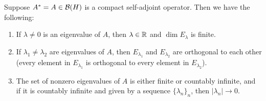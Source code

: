 \begin{theorem}\label{selfadjointeigenspace}
Suppose $A^\ast = A \in \mathcal{B}(H)$ is a compact self-adjoint operator. Then we have the following:
\begin{enumerate}
\item If $\lambda \ne 0$ is an eigenvalue of $A$, then $\lambda \in \mathbb R$ and $\dim E_\lambda$ is finite. 
\item If $\lambda_1 \ne \lambda_2$ are eigenvalues of $A$, then $E_{\lambda_1}$ and $E_{\lambda_2}$ are orthogonal to each other (every element in $E_{\lambda_1}$ is orthogonal to every element in $E_{\lambda_2}$). 
\item The set of nonzero eigenvalues of $A$ is either finite or countably infinite, and if it is countably infinite and given by a sequence $\{\lambda_n\}_n$, then $|\lambda_n| \to 0$.
\end{enumerate}
\end{theorem}
